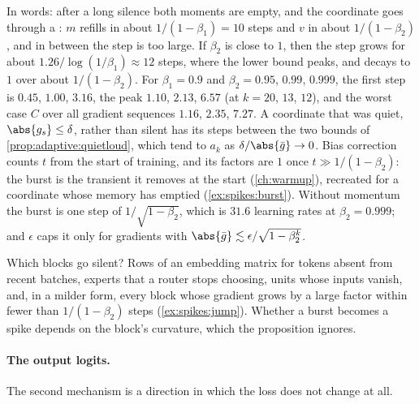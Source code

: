 \begin{refsection}
In words: after a long silence both moments are empty, and the coordinate goes through a : $m$ refills in about $1/(1-\beta_1)=10$ steps and $v$ in about $1/(1-\beta_2)$, and in between the step is too large. If $\beta_2$ is close to $1$, then the step grows for about $1.26/\log(1/\beta_1)\approx12$ steps, where the lower bound peaks, and decays to $1$ over about $1/(1-\beta_2)$. For $\beta_1=0.9$ and $\beta_2=0.95$, $0.99$, $0.999$, the first step is $0.45$, $1.00$, $3.16$, the peak $1.10$, $2.13$, $6.57$ (at $k=20$, $13$, $12$), and the worst case $C$ over all gradient sequences $1.16$, $2.35$, $7.27$. A coordinate that was quiet, $\abs{g_s}\le\delta$, rather than silent has its steps between the two bounds of \cref{prop:adaptive:quietloud}, which tend to $a_k$ as $\delta/\abs{\bar g}\to0$. Bias correction counts $t$ from the start of training, and its factors are $1$ once $t\gg1/(1-\beta_2)$: the burst is the transient it removes at the start (\cref{ch:warmup}), recreated for a coordinate whose memory has emptied (\cref{ex:spikes:burst}). Without momentum the burst is one step of $1/\sqrt{1-\beta_2}$, which is $31.6$ learning rates at $\beta_2=0.999$; and $\epsilon$ caps it only for gradients with $\abs{\bar g}\lesssim\epsilon/\sqrt{1-\beta_2^k}$.

Which blocks go silent? Rows of an embedding matrix for tokens absent from recent batches, experts that a router stops choosing, units whose inputs vanish, and, in a milder form, every block whose gradient grows by a large factor within fewer than $1/(1-\beta_2)$ steps (\cref{ex:spikes:jump}). Whether a burst becomes a spike depends on the block's curvature, which the proposition ignores.

\paragraph{The output logits.} The second mechanism is a direction in which the loss does not change at all.


\end{refsection}
